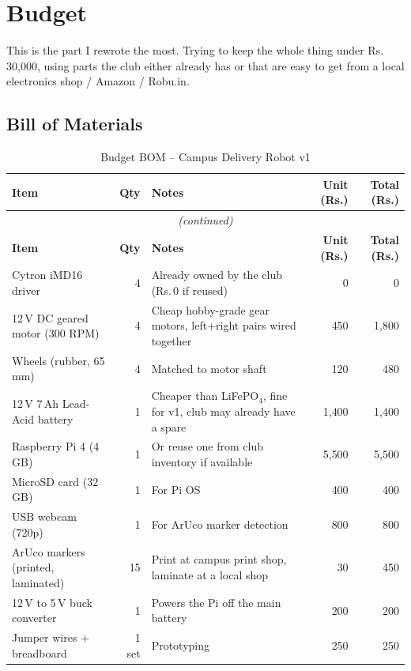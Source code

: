 \documentclass[12pt,a4paper]{article}
\begin{document}
\section{Budget}

This is the part I rewrote the most. Trying to keep the whole thing under Rs.\,30{,}000,
using parts the club either already has or that are easy to get from a local electronics
shop / Amazon / Robu.in.

\subsection{Bill of Materials}

\begin{longtable}{@{}p{4.6cm}rp{3.6cm}rr@{}}
\caption{Budget BOM -- Campus Delivery Robot v1}
\label{tab:bom}\\
\toprule
\textbf{Item} & \textbf{Qty} & \textbf{Notes} & \textbf{Unit (Rs.)} & \textbf{Total (Rs.)} \\
\midrule
\endfirsthead
\multicolumn{5}{c}{\small\itshape (continued)}\\
\toprule
\textbf{Item} & \textbf{Qty} & \textbf{Notes} & \textbf{Unit (Rs.)} & \textbf{Total (Rs.)} \\
\midrule
\endhead
\bottomrule
\endfoot
Cytron iMD16 driver        & 4 & Already owned by the club (Rs.\,0 if reused) & 0 & 0 \\
12\,V DC geared motor (300 RPM) & 4 & Cheap hobby-grade gear motors, left+right pairs wired together & 450 & 1{,}800 \\
Wheels (rubber, 65\,mm)    & 4 & Matched to motor shaft & 120 & 480 \\
12\,V 7\,Ah Lead-Acid battery & 1 & Cheaper than LiFePO$_4$, fine for v1, club may already have a spare & 1{,}400 & 1{,}400 \\
Raspberry Pi 4 (4\,GB)     & 1 & Or reuse one from club inventory if available & 5{,}500 & 5{,}500 \\
MicroSD card (32\,GB)      & 1 & For Pi OS & 400 & 400 \\
USB webcam (720p)          & 1 & For ArUco marker detection & 800 & 800 \\
ArUco markers (printed, laminated) & 15 & Print at campus print shop, laminate at a local shop & 30 & 450 \\
12\,V to 5\,V buck converter & 1 & Powers the Pi off the main battery & 200 & 200 \\
Jumper wires + breadboard  & 1 set & Prototyping & 250 & 250 \\

\end{longtable}
\end{document}
